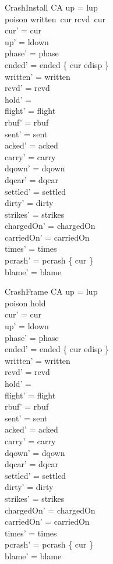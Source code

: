 \documentclass[a4paper,10pt,fleqn]{article}
\begin{document}
\begin{schema}{CrashInstall}
  \Delta CA
\where
  up = lup \\
  poison \in written~cur \setminus rcvd~cur \\
  cur' = cur \\
  up' = ldown \\
  phase' = phase \\
  ended' = ended \oplus \{ cur \mapsto edisp \} \\
  written' = written \\
  rcvd' = rcvd \\
  hold' = \emptyset \\
  flight' = flight \\
  rbuf' = rbuf \\
  sent' = sent \\
  acked' = acked \\
  carry' = carry \\
  dqown' = dqown \\
  dqcar' = dqcar \\
  settled' = settled \\
  dirty' = dirty \\
  strikes' = strikes \\
  chargedOn' = chargedOn \\
  carriedOn' = carriedOn \\
  times' = times \\
  pcrash' = pcrash \cup \{ cur \} \\
  blame' = blame
\end{schema}

\begin{schema}{CrashFrame}
  \Delta CA
\where
  up = lup \\
  poison \in \dom hold \\
  cur' = cur \\
  up' = ldown \\
  phase' = phase \\
  ended' = ended \oplus \{ cur \mapsto edisp \} \\
  written' = written \\
  rcvd' = rcvd \\
  hold' = \emptyset \\
  flight' = flight \\
  rbuf' = rbuf \\
  sent' = sent \\
  acked' = acked \\
  carry' = carry \\
  dqown' = dqown \\
  dqcar' = dqcar \\
  settled' = settled \\
  dirty' = dirty \\
  strikes' = strikes \\
  chargedOn' = chargedOn \\
  carriedOn' = carriedOn \\
  times' = times \\
  pcrash' = pcrash \cup \{ cur \} \\
  blame' = blame
\end{schema}
\end{document}
